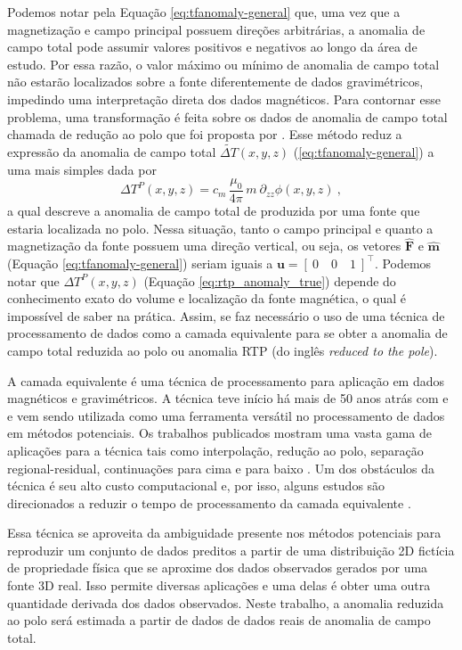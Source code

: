 Podemos notar pela Equação \ref{eq:tfanomaly-general} que, uma vez que a magnetização e campo principal possuem direções arbitrárias, a anomalia de campo total pode assumir valores positivos e negativos ao longo da área de estudo. Por essa razão, o valor máximo ou mínimo de anomalia de campo total não estarão localizados sobre a fonte diferentemente de dados gravimétricos, impedindo uma interpretação direta dos dados magnéticos. 
Para contornar esse problema, uma transformação é feita sobre os dados de anomalia de campo total chamada de redução ao polo que foi proposta por \citet{baranov1957}.
Esse método reduz a expressão da anomalia de campo total $\tilde{\Delta T}(x, y, z)$ (\ref{eq:tfanomaly-general}) a uma mais simples dada por
\begin{equation}
\Delta T^{P}(x, y, z) = c_{m} \, \frac{\mu_{0}}{4\pi} \, m \: \partial_{zz} \phi(x, y, z) \: ,
\label{eq:rtp_anomaly_true}
\end{equation}
a qual descreve a anomalia de campo total de produzida por uma fonte que estaria localizada no polo. Nessa situação, tanto o campo principal e quanto a magnetização da fonte possuem uma direção vertical, ou seja, os vetores $\hat{\mathbf{F}}$ e 
$\hat{\mathbf{m}}$ (Equação \ref{eq:tfanomaly-general}) 
seriam iguais a $\mathbf{u} = \left[\:0 \quad 0 \quad 1 \: \right]^{\top}$.
Podemos notar que  $\Delta T^{P}(x, y, z)$ (Equação \ref{eq:rtp_anomaly_true}) depende do conhecimento exato do volume e localização da fonte magnética, o qual é impossível de saber na prática. Assim, se faz necessário o uso de uma técnica de processamento de dados como a camada equivalente para se obter a anomalia de campo total reduzida ao polo ou anomalia RTP (do inglês \textit{reduced to the pole}).

A camada equivalente é uma técnica de processamento para aplicação em dados magnéticos e gravimétricos. A técnica teve início há mais de 50 anos atrás com \cite{dampney_equivalent_1969} e \cite{emilia_equivalent_1973} e vem sendo utilizada como uma ferramenta versátil no processamento de dados em métodos potenciais. Os trabalhos publicados mostram uma vasta gama de aplicações para a técnica tais como interpolação, redução ao polo, separação regional-residual, continuações para cima e para baixo \citep{mendonca1992,mendonca-silva1995,mendonca2004,macLennan-li2013,silva1986,li-li2014,hansen-miyazaki1984}. Um dos obstáculos da técnica é seu alto custo computacional e, por isso, alguns estudos são direcionados a reduzir o tempo de processamento da camada equivalente \citep{leao-silva1989,mendonca-silva1994,siqueira-etal2017,oliveirajr-etal2013, takahashi-2020,mendonca-2020}.

Essa técnica se aproveita da ambiguidade presente nos métodos potenciais para reproduzir um conjunto de dados preditos a partir de uma distribuição 2D fictícia de propriedade física que se aproxime dos dados observados gerados por uma fonte 3D real. Isso permite diversas aplicações e uma delas é obter uma outra quantidade derivada dos dados observados. Neste trabalho, a  anomalia reduzida ao polo será estimada a partir de dados de dados reais de anomalia de campo total.